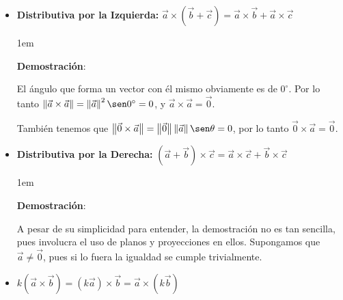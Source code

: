 \documentclass[12pt, fleqn]{report}                             %
\newenvironment{SmallIndentation}[1][0.75em]                    %
        {\begin{adjustwidth}{#1}{}\begin{footnotesize}}             %
        {\end{footnotesize}\end{adjustwidth}}                       %
\theoremstyle{break}                                            %
\newcommand{\Wrap}[1]{\left( #1 \right)}                        %
\newcommand{\Abs}[1]{\left\lVert #1 \right\lVert}               %
\begin{document}
\begin{itemize}
                    
                    \item \textbf{Distributiva por la Izquierda:} 
                        $\vec{a} \times \Wrap{\vec{b}+\vec{c}} = \vec{a} \times \vec{b} + \vec{a} \times \vec{c}$

                        \begin{SmallIndentation}[1em]
                            \textbf{Demostración}:
                            
                            El ángulo que forma un vector con él mismo obviamente es de $0^\circ$.
                            Por lo tanto $\Abs{\vec{a} \times \vec{a}} = \Abs{\vec{a}}^2 \sen 0^\circ = 0$,
                            y $\vec{a} \times \vec{a} = \vec{0}$.
                    
                            También tenemos que $\Abs{\vec{0} \times \vec{a}} 
                            = \Abs{\vec{0}} \Abs{\vec{a}} \sen \theta=0$,
                            por lo tanto $\vec{0} \times \vec{a} = \vec{0}$.
                        
                        \end{SmallIndentation}
                            
                    
                    \item \textbf{Distributiva por la Derecha:}
                        $\Wrap{\vec{a}+\vec{b}} \times \vec{c} = \vec{a} \times \vec{c} + \vec{b} \times \vec{c}$

                        \begin{SmallIndentation}[1em]
                            \textbf{Demostración}:
                            
                            A pesar de su simplicidad para entender, la demostración no es tan sencilla,
                            pues involucra el uso de planos y proyecciones en ellos. Supongamos que
                            $\vec{a} \neq \vec{0}$, pues si lo fuera la igualdad se cumple trivialmente.
                        
                        \end{SmallIndentation}

                    \clearpage
                    
                    \item $k\Wrap{\vec{a} \times \vec{b}} = \Wrap{k \vec{a}} \times \vec{b} = \vec{a} \times \Wrap{k \vec{b}}$


\end{itemize}
\end{document}
